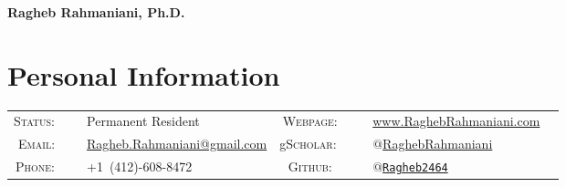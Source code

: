 \documentclass[10PT,letter]{article}
\title{}
\newcommand{\numbox}[1]{} %
\begin{document}
\noindent{}%
{
	\fontsize{34}{36}\mdseries\upshape\sffamily\bfseries Ragheb Rahmaniani, Ph.D.
}
\vspace{1.0cm}

\section*{\numbox{1}\bfseries\textcolor{titlecol}{\sffamily Personal Information}}
              \begin{tabular}{rlcrl}
	               \small\textsc{Status:}~~~ & \small Permanent Resident 	
	               																					& \small\textsc{Webpage:}~~~ &  \multicolumn{1}{l}{
	               																						\small \href{http://www.raghebrahmaniani.com/}{{www.RaghebRahmaniani.com }}
	               																					}
	               \\[.5mm]
	               
	                \small\textsc{Email:}~~~ & \small {\href{mailto:ragheb.rahmaniani@gmail.com}{Ragheb.Rahmaniani@gmail.com}}   
	                																				& \small g\textsc{Scholar:} ~~~ &  \multicolumn{1}{l}{
	                																					\small  \small\href{https://scholar.google.com/citations?user=3V2o0Q0AAAAJ\&hl=en}{$@$RaghebRahmaniani}
	                																				}
	                \\[.5mm]
	                \small\textsc{Phone:}~~~ & \small +1~(412)-608-8472   
	                																				&  \small\textsc{Github:}~~~ & \multicolumn{1}{l}{
	                																					\small \small\href{https://github.com/Ragheb2464}{\texttt{$@$Ragheb2464}}  
                																					}
					\\[.5mm]	               
     \end{tabular}



 
 
\end{document}
